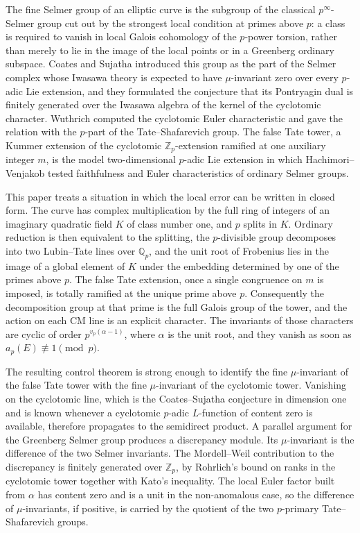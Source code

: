 \documentclass[11pt]{article}
\theoremstyle{definition}
\theoremstyle{remark}
\newcommand{\Z}{\mathbb{Z}}
\newcommand{\Q}{\mathbb{Q}}
\begin{document}
The fine Selmer group of an elliptic curve is the subgroup of the classical \(p^\infty\)-Selmer group cut out by the strongest local condition at primes above \(p\): a class is required to vanish in local Galois cohomology of the \(p\)-power torsion, rather than merely to lie in the image of the local points or in a Greenberg ordinary subspace. Coates and Sujatha introduced this group as the part of the Selmer complex whose Iwasawa theory is expected to have \(\mu\)-invariant zero over every \(p\)-adic Lie extension, and they formulated the conjecture that its Pontryagin dual is finitely generated over the Iwasawa algebra of the kernel of the cyclotomic character. Wuthrich computed the cyclotomic Euler characteristic and gave the relation with the \(p\)-part of the Tate--Shafarevich group. The false Tate tower, a Kummer extension of the cyclotomic \(\Z_p\)-extension ramified at one auxiliary integer \(m\), is the model two-dimensional \(p\)-adic Lie extension in which Hachimori--Venjakob tested faithfulness and Euler characteristics of ordinary Selmer groups.

This paper treats a situation in which the local error can be written in closed form. The curve has complex multiplication by the full ring of integers of an imaginary quadratic field \(K\) of class number one, and \(p\) splits in \(K\). Ordinary reduction is then equivalent to the splitting, the \(p\)-divisible group decomposes into two Lubin--Tate lines over \(\Q_p\), and the unit root of Frobenius lies in the image of a global element of \(K\) under the embedding determined by one of the primes above \(p\). The false Tate extension, once a single congruence on \(m\) is imposed, is totally ramified at the unique prime above \(p\). Consequently the decomposition group at that prime is the full Galois group of the tower, and the action on each CM line is an explicit character. The invariants of those characters are cyclic of order \(p^{v_p(\alpha-1)}\), where \(\alpha\) is the unit root, and they vanish as soon as \(a_p(E)\not\equiv 1\pmod{p}\).

The resulting control theorem is strong enough to identify the fine \(\mu\)-invariant of the false Tate tower with the fine \(\mu\)-invariant of the cyclotomic tower. Vanishing on the cyclotomic line, which is the Coates--Sujatha conjecture in dimension one and is known whenever a cyclotomic \(p\)-adic \(L\)-function of content zero is available, therefore propagates to the semidirect product. A parallel argument for the Greenberg Selmer group produces a discrepancy module. Its \(\mu\)-invariant is the difference of the two Selmer invariants. The Mordell--Weil contribution to the discrepancy is finitely generated over \(\Z_p\), by Rohrlich's bound on ranks in the cyclotomic tower together with Kato's inequality. The local Euler factor built from \(\alpha\) has content zero and is a unit in the non-anomalous case, so the difference of \(\mu\)-invariants, if positive, is carried by the quotient of the two \(p\)-primary Tate--Shafarevich groups.
\end{document}
